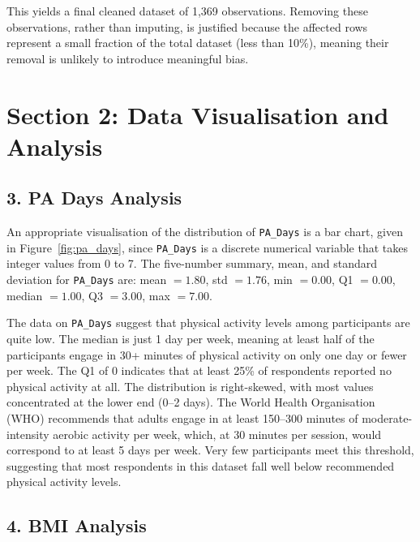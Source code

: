 This yields a final cleaned dataset of 1,369 observations. Removing these observations, rather than imputing, is justified because the affected rows represent a small fraction of the total dataset (less than 10\%), meaning their removal is unlikely to introduce meaningful bias.

\section*{Section 2: Data Visualisation and Analysis}

\subsection*{3. PA Days Analysis}


An appropriate visualisation of the distribution of \lstinline|PA_Days| is a bar chart, given in Figure~\ref{fig:pa_days}, since \lstinline|PA_Days| is a discrete numerical variable that takes integer values from 0 to 7. The five-number summary, mean, and standard deviation for \lstinline|PA_Days| are: mean $= 1.80$, std $= 1.76$, min $= 0.00$, Q1 $= 0.00$, median $= 1.00$, Q3 $= 3.00$, max $= 7.00$.

The data on \lstinline|PA_Days| suggest that physical activity levels among participants are quite low. The median is just 1 day per week, meaning at least half of the participants engage in 30+ minutes of physical activity on only one day or fewer per week. The Q1 of 0 indicates that at least 25\% of respondents reported no physical activity at all. The distribution is right-skewed, with most values concentrated at the lower end (0--2 days). The World Health Organisation (WHO) recommends that adults engage in at least 150--300 minutes of moderate-intensity aerobic activity per week, which, at 30 minutes per session, would correspond to at least 5 days per week. Very few participants meet this threshold, suggesting that most respondents in this dataset fall well below recommended physical activity levels.

\subsection*{4. BMI Analysis}

